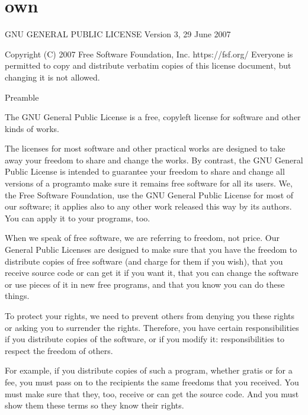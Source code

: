 \documentclass[letterpaper,10pt,english]{sphinxmanual}
\begin{document}
\section{own}
\label{\detokenize{license_own:own}}\label{\detokenize{license_own::doc}}
\begin{sphinxVerbatim}[commandchars=\\\{\}]
                   GNU GENERAL PUBLIC LICENSE
                       Version 3, 29 June 2007

 Copyright (C) 2007 Free Software Foundation, Inc. \PYGZlt{}https://fsf.org/\PYGZgt{}
 Everyone is permitted to copy and distribute verbatim copies
 of this license document, but changing it is not allowed.

                            Preamble

  The GNU General Public License is a free, copyleft license for
software and other kinds of works.

  The licenses for most software and other practical works are designed
to take away your freedom to share and change the works.  By contrast,
the GNU General Public License is intended to guarantee your freedom to
share and change all versions of a program\PYGZhy{}\PYGZhy{}to make sure it remains free
software for all its users.  We, the Free Software Foundation, use the
GNU General Public License for most of our software; it applies also to
any other work released this way by its authors.  You can apply it to
your programs, too.

  When we speak of free software, we are referring to freedom, not
price.  Our General Public Licenses are designed to make sure that you
have the freedom to distribute copies of free software (and charge for
them if you wish), that you receive source code or can get it if you
want it, that you can change the software or use pieces of it in new
free programs, and that you know you can do these things.

  To protect your rights, we need to prevent others from denying you
these rights or asking you to surrender the rights.  Therefore, you have
certain responsibilities if you distribute copies of the software, or if
you modify it: responsibilities to respect the freedom of others.

  For example, if you distribute copies of such a program, whether
gratis or for a fee, you must pass on to the recipients the same
freedoms that you received.  You must make sure that they, too, receive
or can get the source code.  And you must show them these terms so they
know their rights.


\end{sphinxVerbatim}
\end{document}
